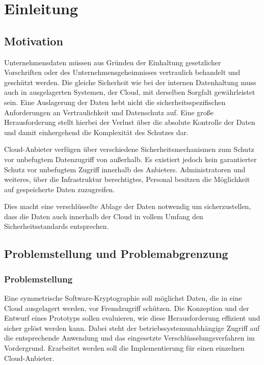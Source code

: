 \documentclass[12pt,a4paper,bibliography=totocnumbered,listof=totocnumbered]{scrartcl}
\begin{document}
\renewcommand{\sectionmark}[1]{\markright{#1}}
\renewcommand{\subsectionmark}[1]{}
\renewcommand{\subsubsectionmark}[1]{}
\rhead{\rightmark}

\doublespacing
\renewcommand{\thesection}{\arabic{section}}
\renewcommand{\theHsection}{\arabic{section}}
\setcounter{section}{0}
\setcounter{page}{1}

\section{Einleitung}
\subsection{Motivation}
Unternehmensdaten müssen aus Gründen der Einhaltung gesetzlicher Vorschriften oder des Unternehmensgeheimnisses vertraulich behandelt und geschützt werden. Die gleiche Sicherheit wie bei der internen Datenhaltung muss auch in ausgelagerten Systemen, der Cloud, mit derselben Sorgfalt gewährleistet sein. Eine Auslagerung der Daten hebt nicht die sicherheitsspezifischen Anforderungen an Vertraulichkeit und Datenschutz auf. Eine große Herausforderung stellt hierbei der Verlust über die absolute Kontrolle der Daten und damit einhergehend die Komplexität des Schutzes dar.

Cloud-Anbieter verfügen über verschiedene Sicherheitsmechanismen zum Schutz vor unbefugtem Datenzugriff von außerhalb. Es existiert jedoch kein garantierter Schutz vor unbefugtem Zugriff innerhalb des Anbieters. Administratoren und weiteres, über die Infrastruktur berechtigtes, Personal besitzen die Möglichkeit auf gespeicherte Daten zuzugreifen.

Dies macht eine verschlüsselte Ablage der Daten notwendig um sicherzustellen, dass die Daten auch innerhalb der Cloud in vollem Umfang den Sicherheitsstandards entsprechen.

\subsection{Problemstellung und Problemabgrenzung}
\subsubsection{Problemstellung}
Eine symmetrische Software-Kryptographie soll möglichst Daten, die in eine Cloud ausgelagert werden,  vor Fremdzugriff schützen. Die Konzeption und der Entwurf eines Prototyps sollen evaluieren, wie diese Herausforderung effizient und sicher gelöst werden kann. Dabei steht der betriebssystemunabhängige Zugriff auf die entsprechende Anwendung und das eingesetzte Verschlüsselungsverfahren im Vordergrund. Erarbeitet werden soll die Implementierung für einen einzelnen Cloud-Anbieter. 
\end{document}
